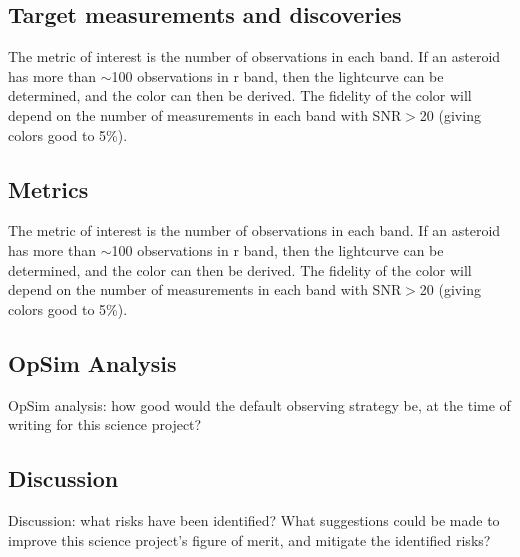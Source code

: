 \subsection{Target measurements and discoveries}
\label{sec:\secname:targets}


The metric of interest is the number
of observations in each band. If an asteroid has
more than $\sim$100 observations in r band,
then the lightcurve can be determined, and the
color can then be derived. The fidelity of the color
will depend on the number of measurements in
each band with SNR$>$20 (giving colors good to
5\%).




\subsection{Metrics}
\label{sec:\secname:metrics}

The metric of interest is the number
of observations in each band. If an asteroid has
more than $\sim$100 observations in r band,
then the lightcurve can be determined, and the
color can then be derived. The fidelity of the color
will depend on the number of measurements in
each band with SNR$>$20 (giving colors good to
5\%).




\subsection{OpSim Analysis}
\label{sec:\secname:analysis}

OpSim analysis: how good would the default observing strategy be, at
the time of writing for this science project?



\subsection{Discussion}
\label{sec:\secname:discussion}

Discussion: what risks have been identified? What suggestions could be
made to improve this science project's figure of merit, and mitigate
the identified risks?




